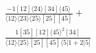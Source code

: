 \documentclass[varwidth, border=5pt]{standalone}
\begin{document}
\begin{my}
$\begin{gathered}
\scriptscriptstyle\frac{-1[12]⟨24⟩[34]⟨45⟩}{⟨12⟩⟨23⟩⟨25⟩[25][45]}+\\
\scriptscriptstyle\frac{1[35][12]⟨45⟩^2[34]}{⟨12⟩⟨25⟩[25][45]⟨5|1+2|5]}\phantom{+}
\end{gathered}$
\end{my}
\end{document}
